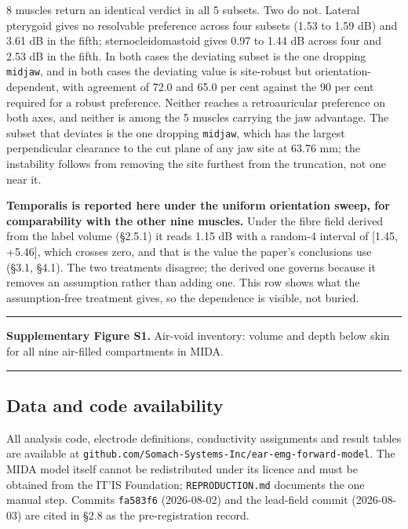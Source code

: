 \documentclass[
  11pt,
  a4paper,
]{article}
\begin{document}
8 muscles return an identical verdict in all 5 subsets. Two do not. Lateral
pterygoid gives no resolvable preference across four subsets (\textminus{}1.53 to \textminus{}1.59 dB)
and \textminus{}3.61 dB in the fifth; sternocleidomastoid gives \textminus{}0.97 to \textminus{}1.44 dB across
four and \textminus{}2.53 dB in the fifth. In both cases the deviating subset is the one
dropping \texttt{midjaw}, and in both cases the deviating value is site-robust but
orientation-dependent, with agreement of 72.0 and 65.0 per cent against the
90 per cent required for a robust preference. Neither reaches a retroauricular
preference on both axes, and neither is among the 5 muscles carrying the jaw
advantage. The subset that deviates is the one dropping \texttt{midjaw}, which has the
largest perpendicular clearance to the cut plane of any jaw site at 63.76 mm; the
instability follows from removing the site furthest from the truncation, not one
near it.

\textbf{Temporalis is reported here under the uniform orientation sweep, for
comparability with the other nine muscles.} Under the fibre field derived from
the label volume (§2.5.1) it reads \textminus{}1.15 dB with a random-4 interval of
{[}\textminus{}1.45, +5.46{]}, which crosses zero, and that is the value the paper's conclusions
use (§3.1, §4.1). The two treatments disagree; the derived one governs because it
removes an assumption rather than adding one. This row shows what the
assumption-free treatment gives, so the dependence is visible, not buried.

\begin{center}\rule{0.5\linewidth}{0.5pt}\end{center}

\textbf{Supplementary Figure S1.} Air-void inventory: volume and depth below skin for
all nine air-filled compartments in MIDA.

\begin{center}\rule{0.5\linewidth}{0.5pt}\end{center}

\FloatBarrier
\subsection{Data and code availability}\label{data-and-code-availability}

All analysis code, electrode definitions, conductivity assignments and result
tables are available at \texttt{github.com/Somach-Systems-Inc/ear-emg-forward-model}.
The MIDA model itself cannot be redistributed under its licence and must be
obtained from the IT'IS Foundation; \texttt{REPRODUCTION.md} documents the one manual
step. Commits \texttt{fa583f6} (2026-08-02) and the lead-field commit (2026-08-03) are
cited in §2.8 as the pre-registration record.
\end{document}
